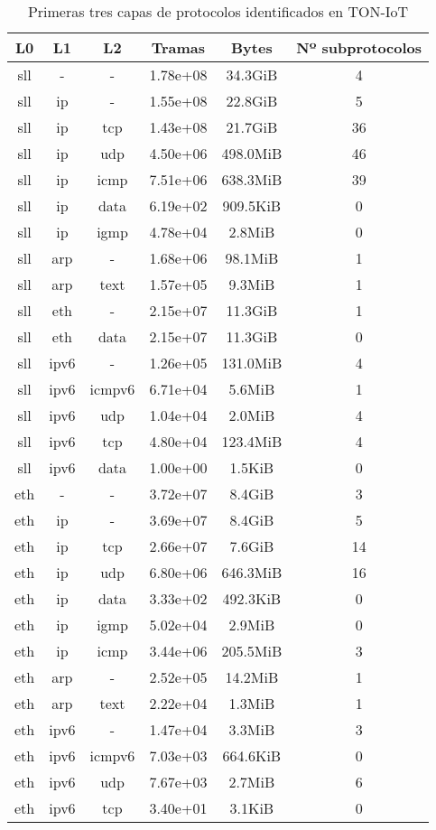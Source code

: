 \begin{table}[H]
    \begin{center}
        \begin{tabular}{|c c c | c c c|} 
            \hline
            \textbf{L0} & \textbf{L1} & \textbf{L2} & \textbf{Tramas} & \textbf{Bytes} & \textbf{Nº subprotocolos}\\
            \hline\hline
sll &- &- & 1.78e+08 & 34.3GiB & 4 \\
sll &ip &- & 1.55e+08 & 22.8GiB & 5 \\
sll &ip &tcp & 1.43e+08 & 21.7GiB & 36 \\
sll &ip &udp & 4.50e+06 & 498.0MiB & 46 \\
sll &ip &icmp & 7.51e+06 & 638.3MiB & 39 \\
sll &ip &data & 6.19e+02 & 909.5KiB & 0 \\
sll &ip &igmp & 4.78e+04 & 2.8MiB & 0 \\
sll &arp &- & 1.68e+06 & 98.1MiB & 1 \\
sll &arp &text & 1.57e+05 & 9.3MiB & 1 \\
sll &eth &- & 2.15e+07 & 11.3GiB & 1 \\
sll &eth &data & 2.15e+07 & 11.3GiB & 0 \\
sll &ipv6 &- & 1.26e+05 & 131.0MiB & 4 \\
sll &ipv6 &icmpv6 & 6.71e+04 & 5.6MiB & 1 \\
sll &ipv6 &udp & 1.04e+04 & 2.0MiB & 4 \\
sll &ipv6 &tcp & 4.80e+04 & 123.4MiB & 4 \\
sll &ipv6 &data & 1.00e+00 & 1.5KiB & 0 \\
eth &- &- & 3.72e+07 & 8.4GiB & 3 \\
eth &ip &- & 3.69e+07 & 8.4GiB & 5 \\
eth &ip &tcp & 2.66e+07 & 7.6GiB & 14 \\
eth &ip &udp & 6.80e+06 & 646.3MiB & 16 \\
eth &ip &data & 3.33e+02 & 492.3KiB & 0 \\
eth &ip &igmp & 5.02e+04 & 2.9MiB & 0 \\
eth &ip &icmp & 3.44e+06 & 205.5MiB & 3 \\
eth &arp &- & 2.52e+05 & 14.2MiB & 1 \\
eth &arp &text & 2.22e+04 & 1.3MiB & 1 \\
eth &ipv6 &- & 1.47e+04 & 3.3MiB & 3 \\
eth &ipv6 &icmpv6 & 7.03e+03 & 664.6KiB & 0 \\
eth &ipv6 &udp & 7.67e+03 & 2.7MiB & 6 \\
eth &ipv6 &tcp & 3.40e+01 & 3.1KiB & 0 \\
            \hline
        \end{tabular}
    \end{center}
    \caption{Primeras tres capas de protocolos identificados en TON-IoT}
    \label{table:toniotprotocols}
\end{table}
